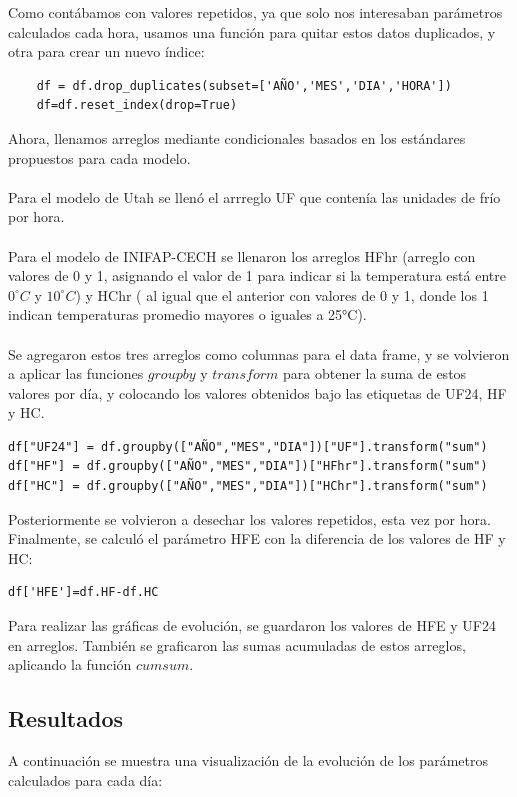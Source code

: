 \documentclass[letterpaper,12pt]{article}
\begin{document}
Como contábamos con valores repetidos, ya que solo nos interesaban parámetros calculados cada hora, usamos una función para quitar estos datos duplicados, y otra para crear un nuevo índice:

\begin{verbatim}
    df = df.drop_duplicates(subset=['AÑO','MES','DIA','HORA'])
    df=df.reset_index(drop=True)
\end{verbatim}

Ahora, llenamos arreglos mediante condicionales basados en los estándares propuestos para cada modelo.
\\
\\
Para el modelo de Utah se llenó el arrreglo UF que contenía las unidades de frío por hora.
\\
\\
Para el modelo de INIFAP-CECH se llenaron los arreglos HFhr (arreglo con valores de 0 y 1, asignando el valor de 1 para indicar si la temperatura está entre $0^\circ C$ y $10^\circ C$) y  HChr ( al igual que el anterior con valores de 0 y 1, donde los 1 indican temperaturas promedio mayores o iguales a 25°C).
\\
\\
Se agregaron estos tres arreglos como columnas para el data frame, y se volvieron a aplicar las funciones $groupby$ y $transform$ para obtener la suma de estos valores por día, y colocando los valores obtenidos bajo las etiquetas de UF24, HF y HC.

\begin{verbatim}
df["UF24"] = df.groupby(["AÑO","MES","DIA"])["UF"].transform("sum")
df["HF"] = df.groupby(["AÑO","MES","DIA"])["HFhr"].transform("sum")
df["HC"] = df.groupby(["AÑO","MES","DIA"])["HChr"].transform("sum")
\end{verbatim}

Posteriormente se volvieron a desechar los valores repetidos, esta vez por hora. Finalmente, se calculó el parámetro HFE con la diferencia de los valores de HF y HC: 

\begin{verbatim}
df['HFE']=df.HF-df.HC      
\end{verbatim}

Para realizar las gráficas de evolución, se guardaron los valores de HFE y UF24 en arreglos. También se graficaron las sumas acumuladas de estos arreglos, aplicando la función $cumsum$.

\subsection{Resultados}
A continuación se muestra una visualización de la evolución de los parámetros calculados para cada día:
\end{document}
